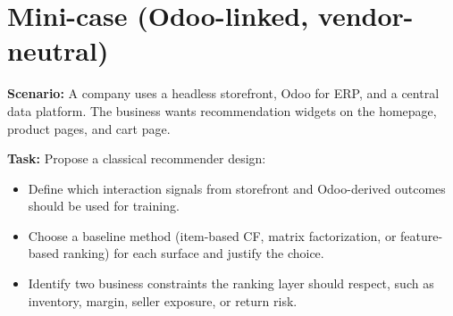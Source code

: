 \section{Mini-case (Odoo-linked, vendor-neutral)}
\textbf{Scenario:} A company uses a headless storefront, Odoo for ERP, and a central data platform. The business wants recommendation widgets on the homepage, product pages, and cart page.

\textbf{Task:} Propose a classical recommender design:
\begin{itemize}
  \item Define which interaction signals from storefront and Odoo-derived outcomes should be used for training.
  \item Choose a baseline method (item-based CF, matrix factorization, or feature-based ranking) for each surface and justify the choice.
  \item Identify two business constraints the ranking layer should respect, such as inventory, margin, seller exposure, or return risk.
\end{itemize}
